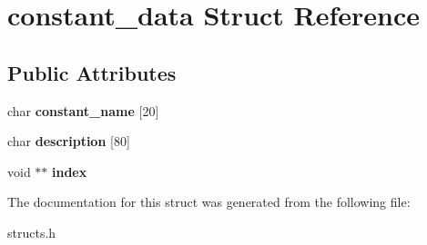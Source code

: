\hypertarget{structconstant__data}{\section{constant\-\_\-data Struct Reference}
\label{structconstant__data}
}
\subsection*{Public Attributes}
\begin{DoxyCompactItemize}
\item 
\hypertarget{structconstant__data_a1c8219b57ea2103001e9ef947dc74bdb}{char {\bfseries constant\-\_\-name} \mbox{[}20\mbox{]}}\label{structconstant__data_a1c8219b57ea2103001e9ef947dc74bdb}

\item 
\hypertarget{structconstant__data_af3adb4820e6f56bf86d5344a783e1328}{char {\bfseries description} \mbox{[}80\mbox{]}}\label{structconstant__data_af3adb4820e6f56bf86d5344a783e1328}

\item 
\hypertarget{structconstant__data_aef93c64d3c1941d9077c0efa118851c0}{void $\ast$$\ast$ {\bfseries index}}\label{structconstant__data_aef93c64d3c1941d9077c0efa118851c0}

\end{DoxyCompactItemize}


The documentation for this struct was generated from the following file\-:\begin{DoxyCompactItemize}
\item 
structs.\-h\end{DoxyCompactItemize}
